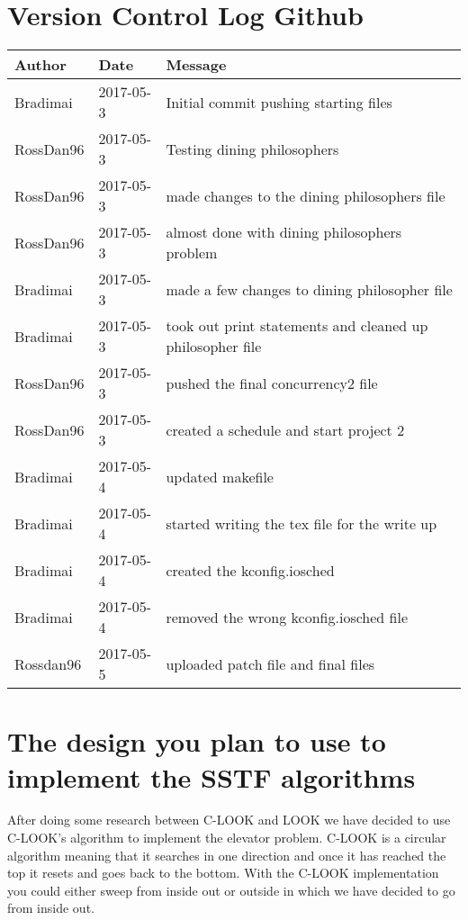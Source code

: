 \documentclass[letterpaper,10pt,titlepage]{article}
\begin{document}
\section{Version Control Log Github}
\begin{tabular}{lll} \textbf{Author}
     & \textbf{Date}
     & \textbf{Message}
\\ \hline
Bradimai & 2017-05-3 & Initial commit pushing starting files \\ \hline
RossDan96 & 2017-05-3 & Testing dining philosophers \\ \hline
RossDan96 & 2017-05-3 & made changes to the dining philosophers file \\ \hline
RossDan96 & 2017-05-3 & almost done with dining philosophers problem \\ \hline
Bradimai & 2017-05-3 & made a few changes to dining philosopher file\\ \hline
Bradimai & 2017-05-3 & took out print statements and cleaned up philosopher file \\ \hline
RossDan96 & 2017-05-3 &  pushed the final concurrency2 file\\ \hline
RossDan96 & 2017-05-3 & created a schedule and start project 2 \\ \hline
Bradimai & 2017-05-4 & updated makefile \\ \hline
Bradimai & 2017-05-4 & started writing the tex file for the write up \\ \hline
Bradimai & 2017-05-4 & created the kconfig.iosched \\ \hline
Bradimai & 2017-05-4 & removed the wrong kconfig.iosched file \\ \hline
Rossdan96 & 2017-05-5 & uploaded patch file and final files \\ \hline



\end{tabular}

\section{The design you plan to use to implement the SSTF algorithms}

After doing some research between C-LOOK and LOOK we have decided to use C-LOOK's algorithm to implement the elevator problem. C-LOOK is a circular algorithm meaning that it searches in one direction and once it has reached the top it resets and goes back to the bottom. With the C-LOOK implementation you could either sweep from inside out or outside in which we have decided to go from inside out.
\end{document}
